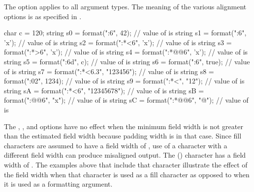 \pnum
The  option applies to all argument types.
The meaning of the various alignment options is as specified in .
\newcommand{\cxxcf}{\emo{🤡}}
\begin{example}
\begin{codeblock}
char c = 120;
string s0 = format("{:6}", 42);             // value of  is 
string s1 = format("{:6}", 'x');            // value of  is 
string s2 = format("{:*<6}", 'x');          // value of  is 
string s3 = format("{:*>6}", 'x');          // value of  is 
string s4 = format("{:*@\caret{}@6}", 'x');          // value of  is 
string s5 = format("{:6d}", c);             // value of  is 
string s6 = format("{:6}", true);           // value of  is 
string s7 = format("{:*<6.3}", "123456");   // value of  is 
string s8 = format("{:02}", 1234);          // value of  is 
string s9 = format("{:*<}", "12");          // value of  is 
string sA = format("{:*<6}", "12345678");   // value of  is 
string sB = format("{:@\cxxcf\caret{}@6}", "x");         // value of  is \tcode{"\cxxcf\cxxcf{}x\cxxcf\cxxcf\cxxcf"}
string sC = format("{:*@\caret{}@6}", "@\cxxcf@");         // value of  is \tcode{"\cxxcf\cxxcf\cxxcf"}
\end{codeblock}
\end{example}
\begin{note}
The , , and  options
have no effect when the minimum field width
is not greater than the estimated field width
because padding width is  in that case.
Since fill characters are assumed to have a field width of ,
use of a character with a different field width can produce misaligned output.
The \cxxcf{} () character has a field width of .
The examples above that include that character
illustrate the effect of the field width
when that character is used as a fill character
as opposed to when it is used as a formatting argument.
\end{note}

